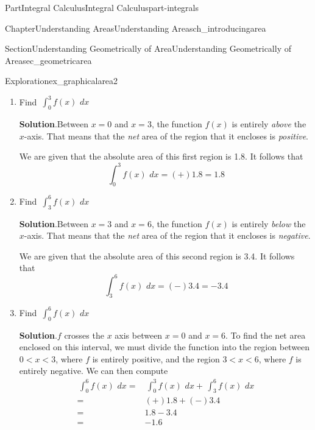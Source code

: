 \documentclass[oneside,10pt,]{tufte-book}
\newcommand{\blocktitlefont}{\relax}
\numberwithin{equation}{chapter}
\newcommand{\intdx}[1]{{\,\int#1\,\,dx}}
\newcommand{\lt}{<}
\newcommand{\amp}{&}
\begin{document}
\begin{partptx}{Part}{Integral Calculus}{}{Integral Calculus}{}{}{part-integrals}
\begin{chapterptx}{Chapter}{Understanding Areas}{}{Understanding Areas}{}{}{ch_introducingarea}
\begin{sectionptx}{Section}{Understanding Geometrically of Area}{}{Understanding Geometrically of Area}{}{}{sec_geometricarea}
\begin{exploration}{Exploration}{}{ex_graphicalarea2}
\begin{image}{0.25}{0.5}{0.25}{}
{
}%
\end{image}%
\begin{enumerate}[font=\bfseries,label=(\alph*),ref=\alph*]%
\item{}Find \(\displaystyle\intdx{_0^3 f(x) }\)%
\par\smallskip%
\noindent\textbf{\blocktitlefont Solution}.\hypertarget{ex_graphicalarea2-2-2}{}\quad{}Between \(x=0\) and \(x=3\), the function \(f(x)\) is entirely \emph{above} the \(x\)-axis. That means that the \emph{net} area of the region that it encloses is \emph{positive}.%
\par
We are given that the absolute area of this first region is 1.8.  It follows that%
\begin{equation*}
\intdx{_0^3 f(x) } = (+) 1.8 = 1.8
\end{equation*}
%
\item{}Find \(\displaystyle\intdx{_3^6 f(x) }\)%
\par\smallskip%
\noindent\textbf{\blocktitlefont Solution}.\hypertarget{ex_graphicalarea2-3-2}{}\quad{}Between \(x=3\) and \(x=6\), the function \(f(x)\) is entirely \emph{below} the \(x\)-axis. That means that the \emph{net} area of the region that it encloses is \emph{negative}.%
\par
We are given that the absolute area of this second region is 3.4.  It follows that%
\begin{equation*}
\intdx{_3^6 f(x) } = (-) 3.4 = -3.4
\end{equation*}
%
\item{}Find \(\displaystyle\intdx{_0^6 f(x) }\)%
\par\smallskip%
\noindent\textbf{\blocktitlefont Solution}.\hypertarget{ex_graphicalarea2-4-2}{}\quad{}\(f\) crosses the \(x\) axis between \(x=0\) and \(x=6\). To find the net area enclosed on this interval, we must divide the function into the region between \(0\lt x \lt 3\), where \(f\) is entirely positive, and the region \(3\lt x\lt 6\), where \(f\) is entirely negative. We can then compute%
\begin{align*}
\intdx{_0^6 f(x)} = \amp \intdx{_0^3 f(x)} + \intdx{_3^6 f(x) } \\
= \amp (+)1.8 + (-)3.4\\
= \amp 1.8 - 3.4 \\
= \amp -1.6
\end{align*}

\end{enumerate}
\end{exploration}
\end{sectionptx}
\end{chapterptx}
\end{partptx}
\end{document}
